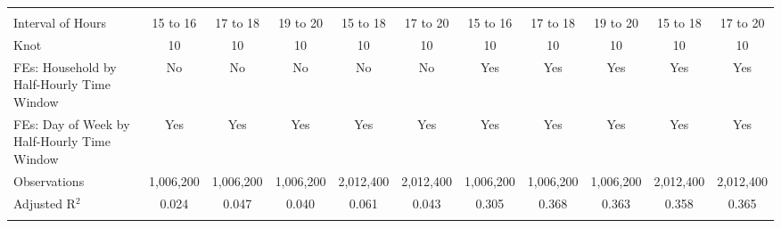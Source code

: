 \begin{table}[!htbp]
\begin{longtable}{@{\extracolsep{0pt}}lcccccccccc}
\hline \\[-1.8ex] 
Interval of Hours & 15 to 16 & 17 to 18 & 19 to 20 & 15 to 18 & 17 to 20 & 15 to 16 & 17 to 18 & 19 to 20 & 15 to 18 & 17 to 20 \\ 
Knot & 10 & 10 & 10 & 10 & 10 & 10 & 10 & 10 & 10 & 10 \\ 
FEs: Household by Half-Hourly Time Window & No & No & No & No & No & Yes & Yes & Yes & Yes & Yes \\ 
FEs: Day of Week by Half-Hourly Time Window & Yes & Yes & Yes & Yes & Yes & Yes & Yes & Yes & Yes & Yes \\ 
Observations & 1,006,200 & 1,006,200 & 1,006,200 & 2,012,400 & 2,012,400 & 1,006,200 & 1,006,200 & 1,006,200 & 2,012,400 & 2,012,400 \\ 
Adjusted R$^{2}$ & 0.024 & 0.047 & 0.040 & 0.061 & 0.043 & 0.305 & 0.368 & 0.363 & 0.358 & 0.365 \\ 
\hline 
\hline \\[-1.8ex] 
\end{longtable} 
\end{table} 
